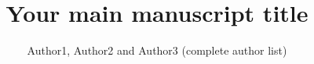 \documentclass[9pt,twoside,lineno]{pnas-new}
\title{Your main manuscript title}
\author{Author1, Author2 and Author3 (complete author list)}
\begin{document}
\maketitle

\SItext


\end{document}
